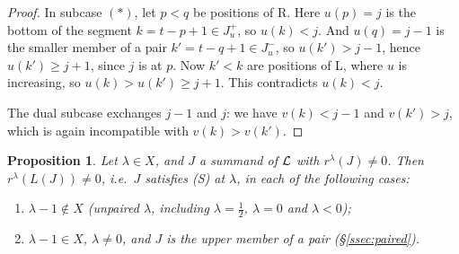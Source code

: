 \documentclass[a4paper,12pt,leqno]{amsart}
\theoremstyle{plain}
\newtheorem{prop}[thm]{Proposition}
\theoremstyle{definition}
\begin{document}
\begin{proof}
In subcase $(\ast)$, let $p<q$ be positions of R. Here $u(p)=j$ is the bottom of the segment
$k=t-p+1\in J^+_u$, so $u(k)<j$. And $u(q)=j-1$ is the smaller member of a pair
$k'=t-q+1\in J^-_u$, so $u(k')>j-1$, hence $u(k')\geq j+1$, since $j$ is at $p$. Now $k'<k$ are
positions of L, where $u$ is increasing, so $u(k)>u(k')\geq j+1$. This contradicts $u(k)<j$.

The dual subcase exchanges $j-1$ and $j$: we have $v(k)<j-1$ and $v(k')>j$, which is again
incompatible with $v(k)>v(k')$.
\end{proof}

\begin{prop}\label{thm:SAM} Let $\lambda\in X$, and $J$ a summand of $\mathcal{L}$ with
$r^\lambda(J)\neq0$. Then $r^\lambda(L(J))\neq0$, i.e.\ $J$ satisfies (S) at $\lambda$, in each of the
following cases:
\begin{enumerate}
\item[(a)] $\lambda-1\notin X$ (unpaired $\lambda$, including $\lambda=\tfrac12$, $\lambda=0$ and $\lambda<0$);
\item[(b)] $\lambda-1\in X$, $\lambda\neq0$, and $J$ is the upper member of a pair (\S\ref{ssec:paired}).
\end{enumerate}
\end{prop}
\end{document}
